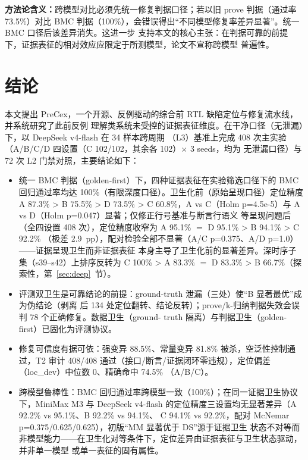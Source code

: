 \documentclass[twocolumn,10pt]{ctexart}
\begin{document}
\textbf{方法论含义：}跨模型对比必须先统一修复判据口径；若以旧 prove 判据（通过率 73.5\%）对比
BMC 判据（100\%），会错误得出“不同模型修复率差异显著”。统一 BMC 口径后该差异消失。这进一步
支持本文的核心主张：在判据可靠的前提下，证据表征的相对效应应限定于所测模型，论文不宣称跨模型
普遍性。

\section{结\quad 论}

本文提出 PreCex，一个开源、反例驱动的综合前 RTL 缺陷定位与修复流水线，并系统研究了此前反例
理解类系统未受控的证据表征维度。在干净口径（无泄漏）下，以 DeepSeek v4-flash 在 34 样本跨周期
（L3）基准上完成 408 次主实验（A/B/C/D 四设置（C 102/102，其余各 102）$\times$ 3 seeds，均为
无泄漏口径）与 72 次 L2 门禁对照，主要结论如下：

\begin{itemize}
\item 统一 BMC 判据（golden-first）下，四种证据表征在实验筛选口径下的 BMC 回归通过率均达
100\%（有限深度口径）。卫生化前（原始呈现口径）定位精度 A 87.3\% > B 75.5\% > D 73.5\% >
C 60.8\%，A vs C（Holm p=4.5e-5）与 A vs D（Holm p=0.047）显著；仅修正行号基准与断言行语义
等呈现问题后（全四设置 408 次），定位精度收窄为 A 95.1\% $=$ D 95.1\% > B 94.1\% > C 92.2\%
（极差 2.9~pp），配对检验全部不显著（A/C p=0.375、A/D p=1.0）——证据呈现卫生而非证据表征
本身主导了卫生化前的显著差异。深时序子集（s39--s42）上排序反转为 C 100\% > A 83.3\% $=$
D 83.3\% > B 66.7\%（探索性，第~\ref{sec:deep}~节）。
\item 评测双卫生是可靠结论的前提：ground-truth 泄漏（三处）使“B 显著最优”成为伪结论（剥离
后 134 处定位翻转、结论反转）；prove/k-归纳判据失效会误判 78 个正确修复。数据卫生（ground-
truth 隔离）与判据卫生（golden-first）已固化为评测协议。
\item 修复可信度有据可依：强变异 88.5\%、常量变异 81.8\% 被杀，空泛性控制通过，T2 审计
408/408 通过（接口/断言/证据闭环零违规），定位偏差（loc\_dev）中位数 0、精确命中 74.5\%
（A/B/C）。
\item 跨模型鲁棒性：BMC 回归通过率跨模型一致（100\%）；在同一证据卫生协议下，MiniMax M3 与
DeepSeek v4-flash 的定位精度三设置均无显著差异（A 92.2\% vs 95.1\%、B 92.2\% vs 94.1\%、
C 94.1\% vs 92.2\%，配对 McNemar p=0.375/0.625/0.625），初版“MM 显著优于 DS”源于证据卫生
状态不对等而非模型能力——在卫生化对等条件下，定位差异由证据表征与卫生状态驱动，并非单一模型
或单一表征的固有属性。
\end{itemize}
\end{document}
